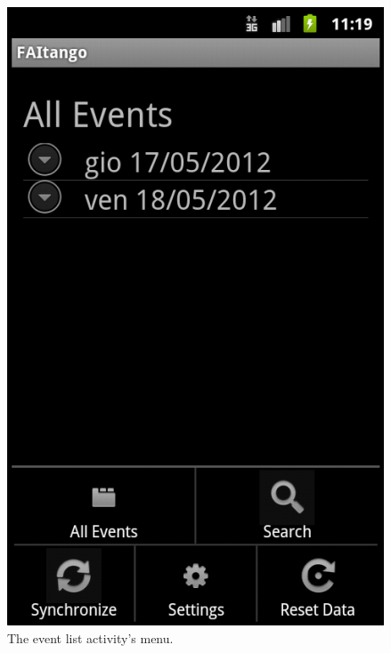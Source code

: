 \documentclass[12pt, twoside]{article}
\begin{document}
\begin{figure}[h]
\begin{center}
\includegraphics[scale=0.60]{fig/event-list-activity.png}
\end{center}
\caption{The event list activity's menu.}
\label{fig:eventlistmenu}
\end{figure}
\end{document}
